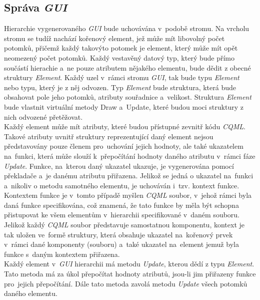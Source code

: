 \documentclass[11pt,twoside,a4paper]{book}
\begin{document}
\subsection {Správa \textit{GUI}}
Hierarchie vygenerovaného \textit{GUI} bude uchovávána v~podobě stromu. Na vrcholu stromu se tudíž nachází kořenový element, jež může mít libovolný počet potomků, přičemž každý takovýto potomek je element, který může mít opět neomezený počet potomků. Každý vestavěný datový typ, který bude přímo součástí hierachie a~ne pouze atributem nějakého elementu, bude dědit z obecné struktury \textit{Element}. Každý uzel v~rámci stromu \textit{GUI}, tak bude typu \textit{Element} nebo typu, který je z něj odvozen. Typ \textit{Element} bude struktura, která bude obsahovat pole jeho potomků, atributy souřadnice a~velikost. Struktura \textit{Element} bude vlastnit virtuální metody Draw a~Update, které budou moci struktury z nich odvozené přetěžovat.\\
Každý element může mít atributy, které budou přístupné zevnitř kódu \textit{CQML}. Takové atributy uvnitř struktury reprezentující daný element nejsou představovány pouze členem pro~uchování jejich hodnoty, ale také ukazatelem na~funkci, která může slouží k~přepočítání hodnoty daného atributu v~rámci fáze \textit{Update}. Funkce, na~kterou daný ukazatel ukazuje, je vygenerována pomocí překladače a~je danému atributu přiřazena. Jelikož se jedná o ukazatel na~funkci a~nikoliv o metodu samotného elementu, je uchováván i~tzv. kontext funkce. Kontextem funkce je v~tomto případě myšlen \textit{CQML} soubor, v~jehož rámci byla daná funkce specifikována, což znamená, že tato funkce by měla být schopna přistupovat ke všem elementům v~hierarchii specifikované v~daném souboru. Jelikož každý \textit{CQML} soubor představuje samostatnou komponentu, kontext je tak uložen ve~formě struktury, která obsahuje ukazatel na~kořenový prvek v~rámci dané komponenty (souboru) a~také ukazatel na~element jemuž byla funkce s~daným kontextem přiřazena.\\
Každý element v~\textit{GUI} hierarchii má metodu \textit{Update}, kterou dědí z typu \textit{Element}. Tato metoda má za úkol přepočítat hodnoty atributů, jsou-li jim přiřazeny funkce pro~jejich přepočítání. Dále tato metoda zavolá metodu \textit{Update} všech potomků daného elementu.
\end{document}
